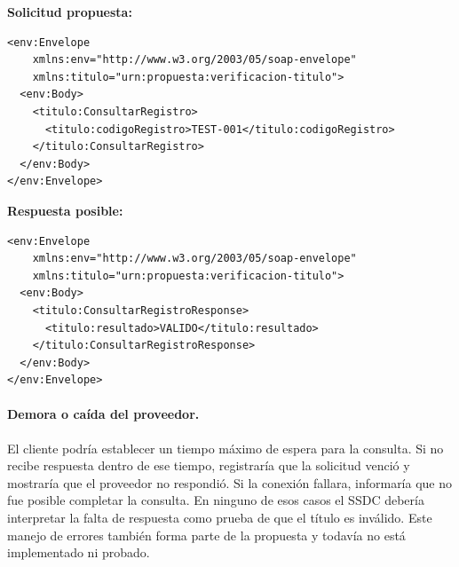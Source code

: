 \textbf{Solicitud propuesta:}
\begin{verbatim}
<env:Envelope
    xmlns:env="http://www.w3.org/2003/05/soap-envelope"
    xmlns:titulo="urn:propuesta:verificacion-titulo">
  <env:Body>
    <titulo:ConsultarRegistro>
      <titulo:codigoRegistro>TEST-001</titulo:codigoRegistro>
    </titulo:ConsultarRegistro>
  </env:Body>
</env:Envelope>
\end{verbatim}

\textbf{Respuesta posible:}
\begin{verbatim}
<env:Envelope
    xmlns:env="http://www.w3.org/2003/05/soap-envelope"
    xmlns:titulo="urn:propuesta:verificacion-titulo">
  <env:Body>
    <titulo:ConsultarRegistroResponse>
      <titulo:resultado>VALIDO</titulo:resultado>
    </titulo:ConsultarRegistroResponse>
  </env:Body>
</env:Envelope>
\end{verbatim}

\paragraph{Demora o caída del proveedor.}
El cliente podría establecer un tiempo máximo de espera para la consulta.
Si no recibe respuesta dentro de ese tiempo, registraría que la solicitud
venció y mostraría que el proveedor no respondió. Si la conexión fallara,
informaría que no fue posible completar la consulta. En ninguno de esos
casos el SSDC debería interpretar la falta de respuesta como prueba de que
el título es inválido. Este manejo de errores también forma parte de la
propuesta y todavía no está implementado ni probado.